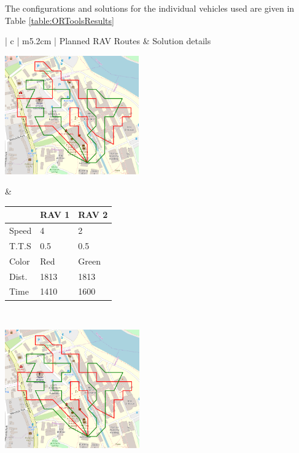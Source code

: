 The configurations and solutions for the individual vehicles used are given in Table \ref{table:ORToolsResults}
\begin{table}[H]
  \centering
  \begin{tabular}{ | c | m{5.2cm} | }
    \hline
    Planned RAV Routes & Solution details \\
    \hline
    
    \begin{minipage}[c][53mm][c]{.6\textwidth}
      \includegraphics[width=\linewidth, height=51mm]{Chapters/MultiAgentCoverage/MultipleTravellingSalesman/Figs/ORToolsSolns/Example1.PNG}

    \end{minipage}
    &
    \small
    \begin{tabular}{m{10mm}|m{11mm} m{11mm}}
        & RAV 1 & RAV 2\\
        \hline
        Speed& 4 & 2 \\
        T.T.S & 0.5 & 0.5 \\
        Color & Red & Green \\
        \hline
        Dist.& 1813 & 1813 \\
        Time& 1410 & 1600 \\
    \end{tabular}
    \normalsize
    \\
    \hline
    \begin{minipage}[c][53mm][c]{.6\textwidth}
      \includegraphics[width=\linewidth, height=51mm]{Chapters/MultiAgentCoverage/MultipleTravellingSalesman/Figs/ORToolsSolns/Example2.PNG}


\end{minipage}
\end{tabular}
\end{table}
